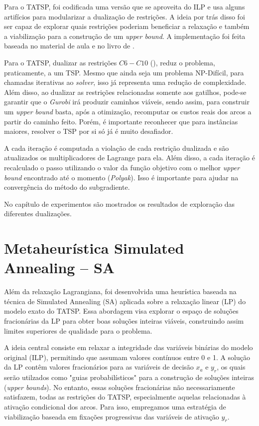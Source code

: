 Para o TATSP, foi codificada uma versão que se aproveita do ILP e usa alguns artifícios para modularizar a dualização de restrições. A ideia por trás disso foi ser capaz de explorar quais restrições poderiam beneficiar a relaxação e também a viabilização para a construção de um \emph{upper bound}. A implementação foi feita baseada no material de aula e no livro de \textcite{Bertsimas1998}.

Para o TATSP, dualizar as restrições $C6 - C10$ (), reduz o problema, praticamente, a um TSP. Mesmo que ainda seja um problema NP-Difícil, para chamadas iterativas ao \emph{solver}, isso já representa uma redução de complexidade. Além disso, ao dualizar as restrições relacionadas somente aos gatilhos, pode-se garantir que o \emph{Gurobi} irá produzir caminhos viáveis, sendo assim, para construir um \emph{upper bound} basta, após a otimização, recomputar os custos reais dos arcos a partir do caminho feito. Porém, é importante reconhecer que para instâncias maiores, resolver o TSP por si só já é muito desafiador.

A cada iteração é computada a violação de cada restrição dualizada e são atualizados os multiplicadores de Lagrange para ela. Além disso, a cada iteração é recalculado o passo utilizando o valor da função objetivo com o melhor \emph{upper bound} encontrado até o momento (\emph{Polyak}). Isso é importante para ajudar na convergência do método do subgradiente.

No capítulo de experimentos são mostrados os resultados de exploração das diferentes dualizações.

\section{Metaheurística Simulated Annealing -- SA}

Além da relaxação Lagrangiana, foi desenvolvida uma heurística baseada na técnica de Simulated Annealing (SA) aplicada sobre a relaxação linear (LP) do modelo exato do TATSP. Essa abordagem visa explorar o espaço de soluções fracionárias da LP para obter boas soluções inteiras viáveis, construindo assim limites superiores de qualidade para o problema.

A ideia central consiste em relaxar a integridade das variáveis binárias do modelo original (ILP), permitindo que assumam valores contínuos entre 0 e 1. A solução da LP contêm valores fracionários para as variáveis de decisão $x_a$ e $y_r$, os quais serão utilzados como "guias probabilísticos" para a construção de soluções inteiras (\emph{upper bounds}). No entanto, essas soluções fracionárias não necessariamente satisfazem, todas as restrições do TATSP, especialmente aquelas relacionadas à ativação condicional dos arcos. Para isso, empregamos uma estratégia de viabilização baseada em fixações progressivas das variáveis de ativação $y_r$.

